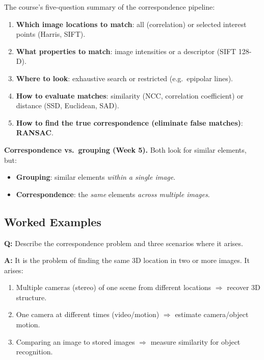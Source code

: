 The course's five-question summary of the correspondence pipeline:
\begin{enumerate}
  \item \textbf{Which image locations to match}: all (correlation) or selected interest points (Harris, SIFT).
  \item \textbf{What properties to match}: image intensities or a descriptor (SIFT 128-D).
  \item \textbf{Where to look}: exhaustive search or restricted (e.g.\ epipolar lines).
  \item \textbf{How to evaluate matches}: similarity (NCC, correlation coefficient) or distance (SSD, Euclidean, SAD).
  \item \textbf{How to find the true correspondence (eliminate false matches)}: \textbf{RANSAC}.
\end{enumerate}

\textbf{Correspondence vs.\ grouping (Week 5).} Both look for similar elements, but:
\begin{itemize}
  \item \textbf{Grouping}: similar elements \emph{within a single image}.
  \item \textbf{Correspondence}: the \emph{same} elements \emph{across multiple images}.
\end{itemize}

\bigseparator

\subsection{Worked Examples}

\begin{exbox}
\textbf{Q:} Describe the correspondence problem and three scenarios where it arises.

\textbf{A:} It is the problem of finding the same 3D location in two or more images. It arises:
\begin{enumerate}
  \item Multiple cameras (stereo) of one scene from different locations $\Rightarrow$ recover 3D structure.
  \item One camera at different times (video/motion) $\Rightarrow$ estimate camera/object motion.
  \item Comparing an image to stored images $\Rightarrow$ measure similarity for object recognition.
\end{enumerate}
\end{exbox}

